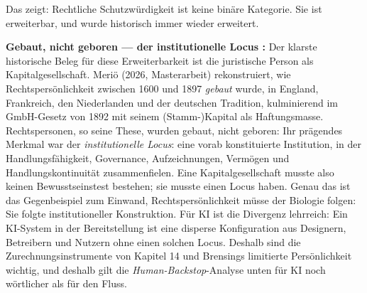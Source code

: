 \documentclass[acmlarge, noacm]{acmart}
\begin{document}
Das zeigt: Rechtliche Schutzwürdigkeit ist keine binäre Kategorie. Sie ist erweiterbar, und wurde historisch immer wieder erweitert.

\noindent\textbf{Gebaut, nicht geboren --- der institutionelle Locus \cite{merio2026}:} Der klarste historische Beleg für diese Erweiterbarkeit ist die juristische Person als Kapitalgesellschaft. Meriö (2026, Masterarbeit) rekonstruiert, wie Rechtspersönlichkeit zwischen 1600 und 1897 \emph{gebaut} wurde, in England, Frankreich, den Niederlanden und der deutschen Tradition, kulminierend im GmbH-Gesetz von 1892 mit seinem (Stamm-)Kapital als Haftungsmasse. Rechtspersonen, so seine These, wurden gebaut, nicht geboren: Ihr prägendes Merkmal war der \emph{institutionelle Locus}: eine vorab konstituierte Institution, in der Handlungsfähigkeit, Governance, Aufzeichnungen, Vermögen und Handlungskontinuität zusammenfielen. Eine Kapitalgesellschaft musste also keinen Bewusstseinstest bestehen; sie musste einen Locus haben. Genau das ist das Gegenbeispiel zum Einwand, Rechtspersönlichkeit müsse der Biologie folgen: Sie folgte institutioneller Konstruktion. Für KI ist die Divergenz lehrreich: Ein KI-System in der Bereitstellung ist eine disperse Konfiguration aus Designern, Betreibern und Nutzern ohne einen solchen Locus. Deshalb sind die Zurechnungsinstrumente von Kapitel 14 und Brensings limitierte Persönlichkeit wichtig, und deshalb gilt die \textit{Human-Backstop}-Analyse unten für KI noch wörtlicher als für den Fluss.
\end{document}
